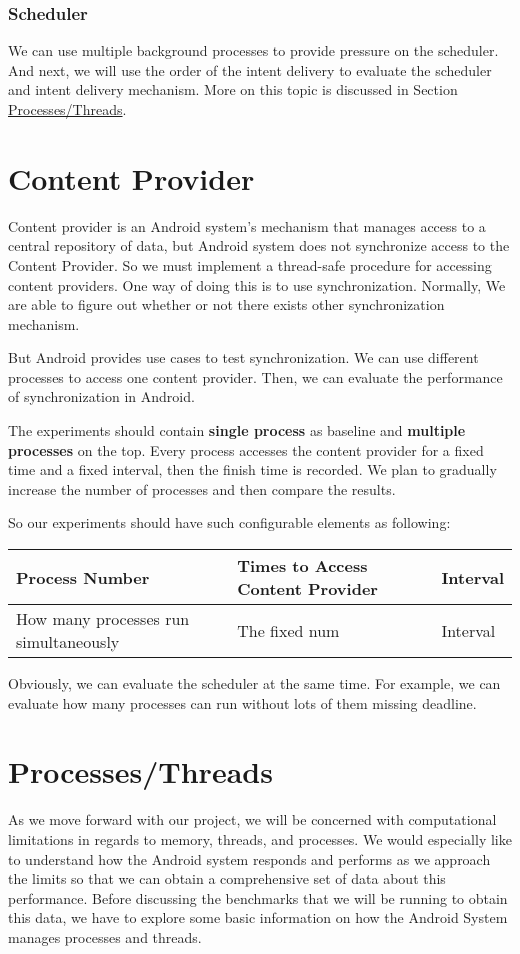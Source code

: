 \documentclass[11pt]{article}
\begin{document}
\subsubsection{Scheduler}
\label{sec-3-2-3}
We can use multiple background processes to provide pressure on the scheduler.
And next, we will use the order of the intent delivery to evaluate the scheduler and intent delivery mechanism. More on this topic is discussed in Section \hyperref[Processes/Threads]{Processes/Threads}.

\section{Content Provider}
\label{sec-4}
Content provider is an Android system's mechanism that manages access to a central repository of data,
but Android system does not synchronize access to the Content Provider.
So we must implement a thread-safe procedure for accessing content providers.
One way of doing this is to use synchronization. Normally, We are able to figure out whether or not there exists other synchronization mechanism.

But Android provides use cases to test synchronization. We can use different processes to access one content provider.
Then, we can evaluate the performance of synchronization in Android.

The experiments should contain \textbf{single process} as baseline and \textbf{multiple processes} on the top.
Every process accesses the content provider for a fixed time and a fixed interval, then the finish time is recorded.
We plan to gradually increase the number of processes and then compare the results.

So our experiments should have such configurable elements as following:

\begin{center}
\begin{tabular}{l|l|l}
Process Number & Times to Access Content Provider & Interval\\
\hline
How many processes run simultaneously & The fixed num & Interval\\
\end{tabular}
\end{center}

Obviously, we can evaluate the scheduler  at the same time.
For example, we can evaluate how many processes can run without lots of them missing deadline.

\section{\label{Processes/Threads}Processes/Threads}
\label{sec-5}
As we move forward with our project, we will be concerned with computational limitations in regards to memory, threads, and processes.  We would especially like to understand how the Android system responds and performs as we approach the limits so that we can obtain a comprehensive set of data about this performance.  Before discussing the benchmarks that we will be running to obtain this data, we have to explore some basic information on how the Android System manages processes and threads.
\end{document}
